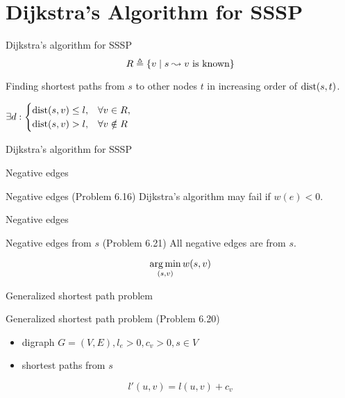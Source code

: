 \section{Dijkstra's Algorithm for SSSP}

\begin{frame}{Dijkstra's algorithm for SSSP}
  \[
	R \triangleq \{v \mid s \leadsto v \text{ is known}\}
  \]

  \vspace{0.50cm}
  \begin{center}
	Finding shortest paths from $s$ to other nodes $t$ in increasing order of $\text{dist}(s,t)$.
  \end{center}

  \begin{theorem}[Invariant]
	$\begin{displaystyle}
	  \exists d: \begin{cases}
		\dist(s,v) \le l, 	& \forall v \in R, \\
		\dist(s,v) > l, 	& \forall v \notin R
	  \end{cases}
	\end{displaystyle}$
  \end{theorem}
\end{frame}
\begin{frame}{Dijkstra's algorithm for SSSP}
\end{frame}
\begin{frame}{Negative edges}
  \begin{exampleblock}{Negative edges (Problem 6.16)}
	Dijkstra's algorithm may fail if $w(e) < 0$.
  \end{exampleblock}

\end{frame}
\begin{frame}{Negative edges}
  \begin{exampleblock}{Negative edges from $s$ (Problem 6.21)}
	All negative edges are from $s$.
  \end{exampleblock}

  \vspace{0.50cm}
  \[
	\operatorname*{arg\,min}_{(s,v)} w(s,v)
  \]
\end{frame}
\begin{frame}{Generalized shortest path problem}
  \begin{exampleblock}{Generalized shortest path problem (Problem 6.20)}
	\begin{itemize}
	  \item digraph $G = (V, E), l_e > 0, c_v > 0, s \in V$
	  \item shortest paths from $s$
	\end{itemize}
  \end{exampleblock}

  \[
	l'(u,v) = l(u,v) + c_v
  \]
\end{frame}
